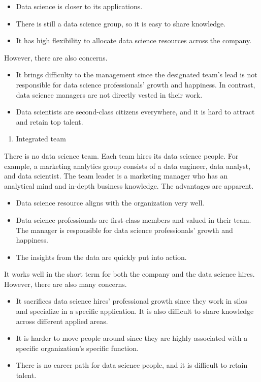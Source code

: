 \documentclass[12pt,]{krantz}
\providecommand{\tightlist}{%
  \setlength{\itemsep}{0pt}\setlength{\parskip}{0pt}}
\begin{document}
\begin{itemize}
\tightlist
\item
  Data science is closer to its applications.
\item
  There is still a data science group, so it is easy to share knowledge.
\item
  It has high flexibility to allocate data science resources across the company.
\end{itemize}

However, there are also concerns.

\begin{itemize}
\tightlist
\item
  It brings difficulty to the management since the designated team's lead is not responsible for data science professionals' growth and happiness. In contrast, data science managers are not directly vested in their work.
\item
  Data scientists are second-class citizens everywhere, and it is hard to attract and retain top talent.
\end{itemize}

\begin{enumerate}
\def\labelenumi{(\arabic{enumi})}
\setcounter{enumi}{2}
\tightlist
\item
  Integrated team
\end{enumerate}

There is no data science team. Each team hires its data science people. For example, a marketing analytics group consists of a data engineer, data analyst, and data scientist. The team leader is a marketing manager who has an analytical mind and in-depth business knowledge. The advantages are apparent.

\begin{itemize}
\tightlist
\item
  Data science resource aligns with the organization very well.
\item
  Data science professionals are first-class members and valued in their team. The manager is responsible for data science professionals' growth and happiness.
\item
  The insights from the data are quickly put into action.
\end{itemize}

It works well in the short term for both the company and the data science hires. However, there are also many concerns.

\begin{itemize}
\tightlist
\item
  It sacrifices data science hires' professional growth since they work in silos and specialize in a specific application. It is also difficult to share knowledge across different applied areas.
\item
  It is harder to move people around since they are highly associated with a specific organization's specific function.
\item
  There is no career path for data science people, and it is difficult to retain talent.
\end{itemize}
\end{document}
